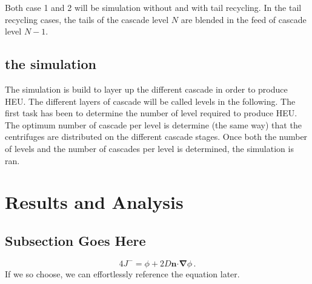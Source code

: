 \documentclass{anstrans}
\renewcommand{\vec}[1]{\bm{#1}} %
\newcommand{\vd}{\bm{\cdot}} %
\newcommand{\grad}{\vec{\nabla}} %
\begin{document}
Both case 1 and 2 will be simulation without and with tail recycling. In the
tail recycling cases, the tails of the cascade level $N$ are blended in the feed
of cascade level $N-1$.

\subsection{the simulation}
The simulation is build to layer up the different cascade in order to produce
HEU. The different layers of cascade will be called levels in the following. The
first task has been to determine the number of level required to produce HEU.
The optimum number of cascade per level is determine (the same way) that the
centrifuges are distributed on the different cascade stages.
Once both the number of levels and the number of cascades per level is
determined, the simulation is ran.



\section{Results and Analysis}

\subsection{Subsection Goes Here}
\begin{equation} \label{eq:marshak}
  4 J^- = \phi + 2 D \vec{n} \vd \grad \phi \,.
\end{equation}
If we so choose, we can effortlessly reference the equation later.
\end{document}
